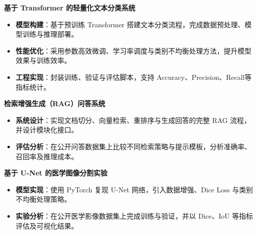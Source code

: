 \documentclass[12pt]{article}
\begin{document}
\vspace{0.4em}

{\large \textbf{基于 Transformer 的轻量化文本分类系统}}

\begin{itemize}
    \item \textbf{模型构建}：基于预训练 Transformer 搭建文本分类流程，完成数据预处理、模型训练与推理部署。
    \item \textbf{性能优化}：采用参数高效微调、学习率调度与类别不均衡处理方法，提升模型效果与训练效率。
    \item \textbf{工程实现}：封装训练、验证与评估脚本，支持 Accuracy、Precision、Recall等指标统计。
\end{itemize}

\vspace{0.4em}

{\large \textbf{检索增强生成（RAG）问答系统}}

\begin{itemize}
    \item \textbf{系统设计}：实现文档切分、向量检索、重排序与生成回答的完整 RAG 流程，并设计模块化接口。
    \item \textbf{评估分析}：在公开问答数据集上比较不同检索策略与提示模板，分析准确率、召回率及推理成本。
\end{itemize}

\vspace{0.4em}

{\large \textbf{基于 U-Net 的医学图像分割实验}}

\begin{itemize}
    \item \textbf{模型实现}：使用 PyTorch 复现 U-Net 网络，引入数据增强、Dice Loss 与类别不均衡处理策略。
    \item \textbf{实验分析}：在公开医学影像数据集上完成训练与验证，并以 Dice、IoU 等指标评估及可视化结果。
\end{itemize}

\vspace{-0.7em}

\end{document}

